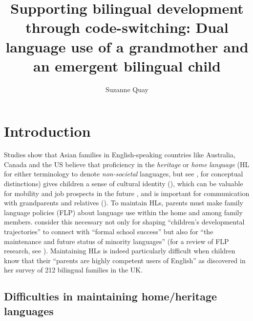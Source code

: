 \documentclass[output=paper,colorlinks,citecolor=brown]{langscibook}
\author{Suzanne Quay\orcid{}\affiliation{International Christian University, Tokyo}}
\title[Supporting bilingual development through code-switching]{Supporting bilingual development through code-switching: Dual language use of a grandmother and an emergent bilingual child}
\begin{document}
\maketitle 

\section{Introduction}

Studies show that Asian families in English-speaking countries like Australia, Canada and the US believe that proficiency in the \textit{heritage} or \textit{home} \textit{language} (HL for either terminology to denote \textit{non-societal} languages, but see \citet{EisenchlasSchalley2020}, for conceptual distinctions) gives children a sense of cultural identity (\citealt{LiangShin2021, ShenJiang2021}), which can be valuable for mobility and job prospects in the future \citep{Mu2014}, and is important for communication with grandparents and relatives (\citealt{ParkSarkar2007, TranEtAl2022}). To maintain HLs, parents must make family language policies (FLP) about language use within the home and among family members. \citet[907]{KingEtAl2008} consider this necessary not only for shaping “children’s developmental trajectories” to connect with “formal school success” but also for “the maintenance and future status of minority languages” (for a review of FLP research, see  \citealt{LanzaLomeuGomes2020}). Maintaining HLs is indeed particularly difficult when children know that their “parents are highly competent users of English” as \citet[210]{Little2020a} discovered in her survey of 212 bilingual families in the UK.

\subsection{Difficulties in maintaining home/heritage languages}\label{sec:quay:1.1}
\end{document}

